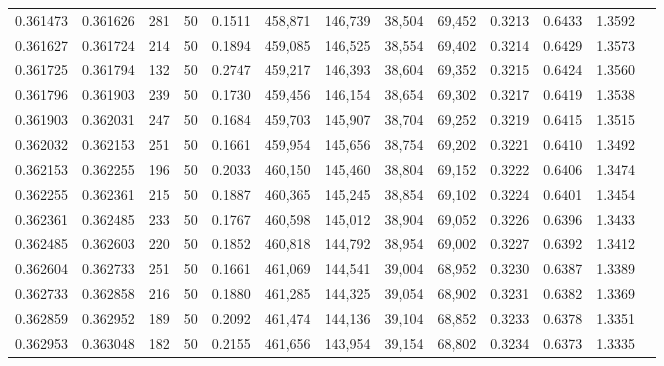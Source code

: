 \begin{tabular}{rrrrrrrrrrrrr}
0.361473 & 0.361626 &   281 &  50 &                                     0.1511 & 458,871 & 146,739 &  38,504 &  69,452 & 0.3213 & 0.6433 & 1.3592 \\
0.361627 & 0.361724 &   214 &  50 &                                     0.1894 & 459,085 & 146,525 &  38,554 &  69,402 & 0.3214 & 0.6429 & 1.3573 \\
0.361725 & 0.361794 &   132 &  50 &                                     0.2747 & 459,217 & 146,393 &  38,604 &  69,352 & 0.3215 & 0.6424 & 1.3560 \\
0.361796 & 0.361903 &   239 &  50 &                                     0.1730 & 459,456 & 146,154 &  38,654 &  69,302 & 0.3217 & 0.6419 & 1.3538 \\
0.361903 & 0.362031 &   247 &  50 &                                     0.1684 & 459,703 & 145,907 &  38,704 &  69,252 & 0.3219 & 0.6415 & 1.3515 \\
0.362032 & 0.362153 &   251 &  50 &                                     0.1661 & 459,954 & 145,656 &  38,754 &  69,202 & 0.3221 & 0.6410 & 1.3492 \\
0.362153 & 0.362255 &   196 &  50 &                                     0.2033 & 460,150 & 145,460 &  38,804 &  69,152 & 0.3222 & 0.6406 & 1.3474 \\
0.362255 & 0.362361 &   215 &  50 &                                     0.1887 & 460,365 & 145,245 &  38,854 &  69,102 & 0.3224 & 0.6401 & 1.3454 \\
0.362361 & 0.362485 &   233 &  50 &                                     0.1767 & 460,598 & 145,012 &  38,904 &  69,052 & 0.3226 & 0.6396 & 1.3433 \\
0.362485 & 0.362603 &   220 &  50 &                                     0.1852 & 460,818 & 144,792 &  38,954 &  69,002 & 0.3227 & 0.6392 & 1.3412 \\
0.362604 & 0.362733 &   251 &  50 &                                     0.1661 & 461,069 & 144,541 &  39,004 &  68,952 & 0.3230 & 0.6387 & 1.3389 \\
0.362733 & 0.362858 &   216 &  50 &                                     0.1880 & 461,285 & 144,325 &  39,054 &  68,902 & 0.3231 & 0.6382 & 1.3369 \\
0.362859 & 0.362952 &   189 &  50 &                                     0.2092 & 461,474 & 144,136 &  39,104 &  68,852 & 0.3233 & 0.6378 & 1.3351 \\
0.362953 & 0.363048 &   182 &  50 &                                     0.2155 & 461,656 & 143,954 &  39,154 &  68,802 & 0.3234 & 0.6373 & 1.3335 \\

\end{tabular}

